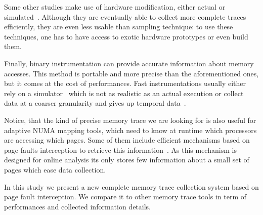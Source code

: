 Some other studies make use of hardware modification, either actual or
simulated~\cite{Bao08HMTT,Martonosi92MemSpy}.  Although they are eventually able to collect
more complete traces efficiently, they are even less usable than sampling technique: to use
these techniques, one has to have access to exotic hardware prototypes or even build them.

Finally, binary instrumentation can provide accurate information about memory accesses.
This method is portable and  more precise than the aforementioned ones,
but it comes at the cost of performances. Fast
instrumentations usually either rely on a simulator~\cite{DeRose02SIGMA} which is not as realistic as an actual execution
or collect data at a coarser granularity and gives up temporal data~\cite{Beniamine15TABARNACRR}.

Notice, that the kind of precise memory trace we are looking for is also useful for adaptive NUMA mapping tools, which
need to know at runtime which processors are accessing which pages. Some of
them include efficient mechanisms based on page faults interception to
retrieve this information~\cite{Diener13CommunicationBased}. As this
mechanism is designed for online analysis its only stores few information about
a small set of pages which ease data collection.

In this study we present a new complete memory trace collection system based on page
fault interception. We compare it to other memory trace tools in term of
performances and collected information details.
